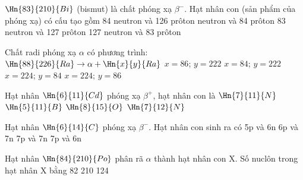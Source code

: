 \begin{vidu}%
$\Hn{83}{210}{Bi}$ (bismut) là chất phóng xạ $\beta^-$. Hạt nhân con (sản phẩm của phóng xạ) có cấu tạo gồm
\choice
{84 neutron và 126 prôton}
{ neutron và 84 prôton}
{83 neutron và 127 prôton}
{127 neutron và 83 prôton}
\end{vidu}
\begin{vidu}%
Chất radi phóng xạ $\alpha$ có phương trình: $\Hn{88}{226}{Ra}\to \alpha + \Hn{x}{y}{Ra}$
\choice
{\True $x=86$; $y=222$}
{$x=84$; $y=222$}
{$x=224$; $y=84$}
{$x=224$; $y=86$}
\end{vidu}
\begin{vidu}%
Hạt nhân $\Hn{6}{11}{Cd}$ phóng xạ $\beta^+$, hạt nhân con là
\choice
{$\Hn{7}{11}{N}$}
{\True $\Hn{5}{11}{B}$}
{$\Hn{8}{15}{O}$}
{$\Hn{7}{12}{N}$}
\end{vidu}
\begin{vidu}%
Hạt nhân $\Hn{6}{14}{C}$ phóng xạ $\beta^-$. Hạt nhân con sinh ra có
\choice
{5p và 6n}
{6p và 7n}
{\True 7p và 7n}
{7p và 6n}
\end{vidu}
\begin{vidu}%
Hạt nhân $\Hn{84}{210}{Po}$ phân rã $\alpha$ thành hạt nhân con X. Số nuclôn trong hạt nhân X bằng
\choice
{82}
{210}
{124}
{}	
\end{vidu}
